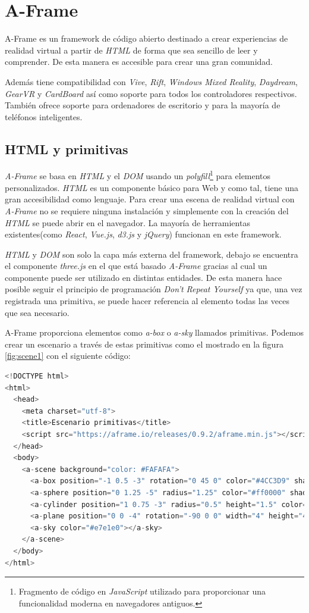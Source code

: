 \section{A-Frame}
\label{sec:aframe}
A-Frame es un framework de código abierto destinado a crear experiencias de realidad virtual a partir de \textit{HTML} de forma que sea sencillo de leer y comprender. De esta manera es accesible para crear una gran comunidad. 


Además tiene compatibilidad con \textit{Vive}, \textit{Rift}, \textit{Windows Mixed Reality}, \textit{Daydream}, \textit{GearVR} y \textit{CardBoard} así como soporte para todos los controladores respectivos. También ofrece soporte para ordenadores de escritorio y para la mayoría de teléfonos inteligentes.

\subsection{HTML y primitivas}
\textit{A-Frame }se basa en \textit{HTML} y el \textit{DOM} usando un \textit{polyfill}\footnote{Fragmento de código en \textit{JavaScript} utilizado para proporcionar una funcionalidad moderna en navegadores antiguos.} para elementos personalizados. \textit{HTML} es un componente básico para Web y como tal, tiene una gran accesibilidad como lenguaje. Para crear una escena de realidad virtual con \textit{A-Frame} no se requiere ninguna instalación y simplemente con la creación del \textit{HTML} se puede abrir en el navegador. La mayoría de herramientas existentes(como \textit{React}, \textit{Vue.js}, \textit{d3.js} y \textit{jQuery}) funcionan en este framework. 

\textit{HTML} y \textit{DOM} son solo la capa más externa del framework, debajo se encuentra el componente \textit{three.js} en el que está basado \textit{A-Frame} gracias al cual un componente puede ser utilizado en distintas entidades. De esta manera hace posible seguir el principio de programación \textit{Don't Repeat Yourself} ya que, una vez registrada una primitiva, se puede hacer referencia al elemento todas las veces que sea necesario.  

A-Frame proporciona elementos como \textit{a-box} o \textit{a-sky} llamados primitivas. Podemos crear un escenario a través de estas primitivas como el mostrado en la figura \ref{fig:scene1} con el siguiente código: 

\begin{lstlisting}[language=javascript, caption=Código con primitivas que representa un escenario]
<!DOCTYPE html>
<html>
  <head>
    <meta charset="utf-8">
    <title>Escenario primitivas</title>
    <script src="https://aframe.io/releases/0.9.2/aframe.min.js"></script>
  </head>
  <body>
    <a-scene background="color: #FAFAFA">
      <a-box position="-1 0.5 -3" rotation="0 45 0" color="#4CC3D9" shadow></a-box>
      <a-sphere position="0 1.25 -5" radius="1.25" color="#ff0000" shadow></a-sphere>
      <a-cylinder position="1 0.75 -3" radius="0.5" height="1.5" color="#FFC65D" shadow></a-cylinder>
      <a-plane position="0 0 -4" rotation="-90 0 0" width="4" height="4" color=" #1cde83" shadow></a-plane>
      <a-sky color="#e7e1e0"></a-sky>
    </a-scene>
  </body>
</html>
\end{lstlisting}

